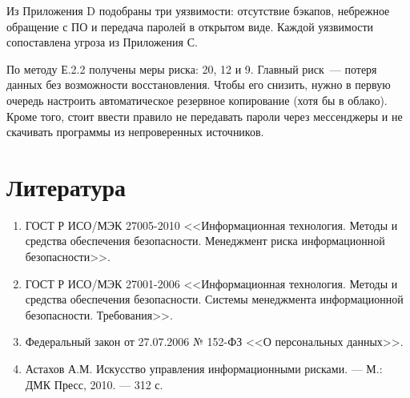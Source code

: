 \documentclass[a4paper,14pt]{extarticle}
\begin{document}
Из Приложения D подобраны три уязвимости: отсутствие бэкапов, небрежное обращение с ПО и передача паролей в открытом виде. Каждой уязвимости сопоставлена угроза из Приложения С.

По методу Е.2.2 получены меры риска: 20, 12 и 9. Главный риск~--- потеря данных без возможности восстановления. Чтобы его снизить, нужно в первую очередь настроить автоматическое резервное копирование (хотя бы в облако). Кроме того, стоит ввести правило не передавать пароли через мессенджеры и не скачивать программы из непроверенных источников.

\section{Литература}

\begin{enumerate}
\item ГОСТ Р ИСО/МЭК 27005-2010 <<Информационная технология. Методы и средства обеспечения безопасности. Менеджмент риска информационной безопасности>>.
\item ГОСТ Р ИСО/МЭК 27001-2006 <<Информационная технология. Методы и средства обеспечения безопасности. Системы менеджмента информационной безопасности. Требования>>.
\item Федеральный закон от 27.07.2006 № 152-ФЗ <<О персональных данных>>.
\item Астахов А.М. Искусство управления информационными рисками. --- М.: ДМК Пресс, 2010. --- 312 с.
\end{enumerate}
\end{document}
